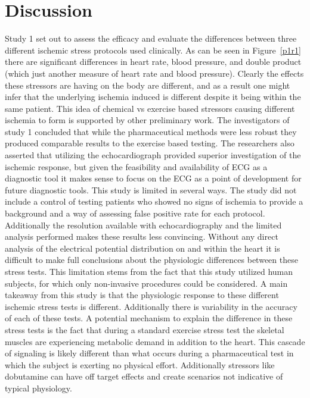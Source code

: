 \documentclass[12pt]{article}
\begin{document}



\section{Discussion}

Study 1 set out to assess the efficacy and evaluate the differences between three different ischemic stress protocols used clinically. As can be seen in Figure~\ref{p1r1} there are significant differences in heart rate, blood pressure, and double product (which just another measure of heart rate and blood pressure). Clearly the effects these stressors are having on the body are different, and as a result one might infer that the underlying ischemia induced is different despite it being within the same patient. This idea of chemical vs exercise based stressors causing different ischemia to form is supported by other preliminary work.\cite{Zenger2019} The investigators of study 1 concluded that while the pharmaceutical methods were less robust they produced comparable results to the exercise based testing. The researchers also asserted that utilizing the echocardiograph provided superior investigation of the ischemic response, but given the feasibility and availability of ECG as a diagnostic tool it makes sense to focus on the ECG as a point of development for future diagnostic tools. This study is limited in several ways. The study did not include a control of testing patients who showed no signs of ischemia to provide a background and a way of assessing false positive rate for each protocol. Additionally the resolution available with echocardiography and the limited analysis performed makes these results less convincing. Without any direct analysis of the electrical potential distribution on and within the heart it is difficult to make full conclusions about the physiologic differences between these stress tests. This limitation stems from the fact that this study utilized human subjects, for which only non-invasive procedures could be considered. A main takeaway from this study is that the physiologic response to these different ischemic stress tests is different. Additionally there is variability in the accuracy of each of these tests. A potential mechanism to explain the difference in these stress tests is the fact that during a standard exercise stress test the skeletal muscles are experiencing metabolic demand in addition to the heart. This cascade of signaling is likely different than what occurs during a pharmaceutical test in which the subject is exerting no physical effort. Additionally stressors like dobutamine can have off target effects and create scenarios not indicative of typical physiology.
\end{document}
